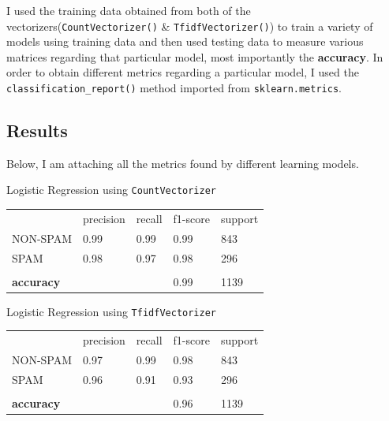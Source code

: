 I used the training data obtained from both of the vectorizers(\verb|CountVectorizer()| \& \verb|TfidfVectorizer()|) to train a variety of models using training data and then used testing data to measure various matrices regarding that particular model, most importantly the \textbf{accuracy}.
In order to obtain different metrics regarding a particular model, I used the \verb|classification_report()| method imported from \verb|sklearn.metrics|.

\subsection{Results}\label{subsec:results}
Below, I am attaching all the metrics found by different learning models.

Logistic Regression using \verb|CountVectorizer|
\begin{table}[H]
    \begin{tabular}{lllll}
        & precision & recall & f1-score                     & support \\
        NON-SPAM          & 0.99      & 0.99   & 0.99                         & 843     \\
        SPAM              & 0.98      & 0.97   & 0.98                         & 296     \\
        &           &        &                              &         \\
        \textbf{accuracy} &           &        & \cellcolor[HTML]{FFCCC9}0.99 & 1139
    \end{tabular}\label{tab:Logistic_count_vect}
\end{table}

Logistic Regression using \verb|TfidfVectorizer|
\begin{table}[H]
    \begin{tabular}{lllll}
        & precision & recall & f1-score                     & support \\
        NON-SPAM          & 0.97      & 0.99   & 0.98                         & 843     \\
        SPAM              & 0.96      & 0.91   & 0.93                         & 296     \\
        &           &        &                              &         \\
        \textbf{accuracy} &           &        & \cellcolor[HTML]{FFCCC9}0.96 & 1139
    \end{tabular}\label{tab:Logistic_tfidf_vect}
\end{table}

